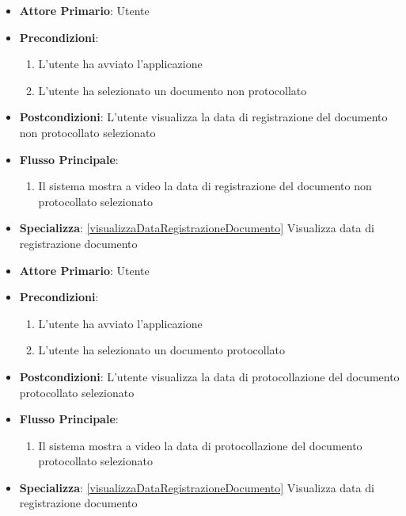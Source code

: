 \begin{itemize}
\item \textbf{Attore Primario}: Utente
    \item \textbf{Precondizioni}:
    \begin{enumerate}
        \item L'utente ha avviato l'applicazione
        \item L'utente ha selezionato un documento non protocollato
    \end{enumerate}
    \item \textbf{Postcondizioni}: L'utente visualizza la data di registrazione del documento non protocollato selezionato
    \item \textbf{Flusso Principale}:
        \begin{enumerate}
            \item Il sistema mostra a video la data di registrazione del documento non protocollato selezionato
        \end{enumerate}
    \item \textbf{Specializza}: \ref{visualizzaDataRegistrazioneDocumento} Visualizza data di registrazione documento
\end{itemize}

\begin{itemize}
\item \textbf{Attore Primario}: Utente
    \item \textbf{Precondizioni}:
    \begin{enumerate}
        \item L'utente ha avviato l'applicazione
        \item L'utente ha selezionato un documento protocollato
    \end{enumerate}
    \item \textbf{Postcondizioni}: L'utente visualizza la data di protocollazione del documento protocollato selezionato
    \item \textbf{Flusso Principale}:
        \begin{enumerate}
            \item Il sistema mostra a video la data di protocollazione del documento protocollato selezionato
        \end{enumerate}
    \item \textbf{Specializza}: \ref{visualizzaDataRegistrazioneDocumento} Visualizza data di registrazione documento
\end{itemize}

